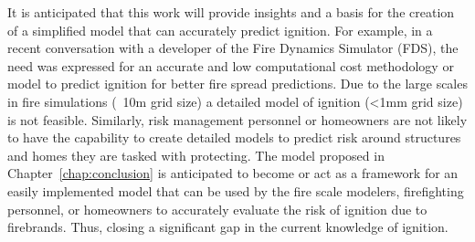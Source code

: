     It is anticipated that this work will provide insights and a basis for the creation of a simplified model that can accurately predict ignition. For example, in a recent conversation with a developer of the Fire Dynamics Simulator (FDS), the need was expressed for an accurate and low computational cost methodology or model to predict ignition for better fire spread predictions. Due to the large scales in fire simulations (~10\si{\meter} grid size) a detailed model of ignition (<1\si{\milli\meter} grid size) is not feasible. Similarly, risk management personnel or homeowners are not likely to have the capability to create detailed models to predict risk around structures and homes they are tasked with protecting. The model proposed in Chapter~\ref{chap:conclusion} is anticipated to become or act as a framework for an easily implemented model that can be used by the fire scale modelers, firefighting personnel, or homeowners to accurately evaluate the risk of ignition due to firebrands. Thus, closing a significant gap in the current knowledge of ignition. 